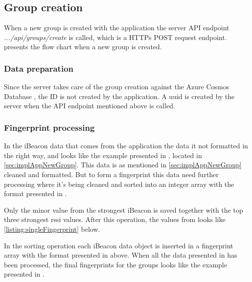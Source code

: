 \subsection{Group creation}\label{sec:implServerGroupCreation}
When a new group is created with the application the server API endpoint \textit{.../api/groups/create} is called, which is a HTTPs POST request \cite{POSTHTTPMDN} endpoint.
 presents the flow chart when a new group is created.



\subsubsection{Data preparation}\label{sec:implServerGroupCreationDataPrep}
Since the server takes care of the group creation against the Azure Cosmos Database \cite{IntroductionAzureCosmos}, the ID is not created by the application.
A \acrfull{uuid} \cite{CommonsIdUUID} is created by the server when the API endpoint mentioned above is called.


\subsubsection{Fingerprint processing}\label{sec:implServerGroupCreationFingerprint}

In the iBeacon data that comes from the application the data it not formatted in the right way, and looks like the example presented in , located in \cref{sec:implAppNewGroup}.
This data is as mentioned in \cref{sec:implAppNewGroup} cleaned and formatted.
But to form a fingerprint this data need further processing where it's being cleaned and sorted into an integer array with the format presented in .

\bigskip

Only the minor value from the strongest iBeacon is saved together with the top three strongest \acrshort{rssi} values. After this operation, the values from  looks like \cref{listing:singleFingerprint} below.


In the sorting operation each iBeacon data object is inserted in a fingerprint array with the format presented in  above.
When all the data presented in   has been processed, the final fingerprints for the groups looks like the example presented in .

